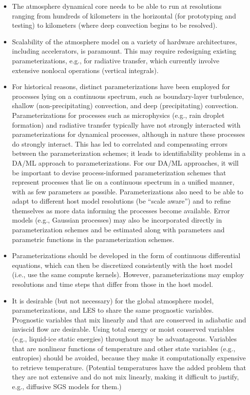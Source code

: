 \documentclass{article}
\begin{document}
\begin{itemize}
    \item The atmosphere dynamical core needs to be able to run at resolutions ranging from hundreds of kilometers in the horizontal (for prototyping and testing) to kilometers (where deep convection begins to be resolved).
    \item Scalability of the atmosphere model on a variety of hardware architectures, including accelerators, is paramount. This may require redesigning existing parameterizations, e.g., for radiative transfer, which currently involve extensive nonlocal operations (vertical integrals). 
    \item For historical reasons, distinct parameterizations have been employed for processes lying on a continuous spectrum, such as boundary-layer turbulence, shallow (non-precipitating) convection, and deep (precipitating) convection. Parameterizations for processes such as microphysics (e.g., rain droplet formation) and radiative transfer typically have not strongly interacted with parameterizations for dynamical processes, although in nature these processes do strongly interact. This has led to correlated and compensating errors between the parameterization schemes; it leads to identifiability problems in a DA/ML approach to parameterizations. For our DA/ML approaches, it will be important to devise process-informed parameterization schemes that represent processes that lie on a continuous spectrum in a unified manner, with as few parameters as possible. Parameterizations also need to be able to adapt to different host model resolutions (be ``scale aware'') and to refine themselves as more data informing the processes become available. Error models (e.g., Gaussian processes) may also be incorporated directly in parameterization schemes and be estimated along with parameters and parametric functions in the parameterization schemes. 
    \item Parameterizations should be developed in the form of continuous differential equations, which can then be discretized consistently with the host model (i.e., use the same compute kernels). However, parameterizations may employ resolutions and time steps that differ from those in the host model. 
    \item It is desirable (but not necessary) for the global atmosphere model, parameterizations, and LES to share the same prognostic variables. Prognostic variables that mix linearly and that are conserved in adiabatic and inviscid flow are desirable. Using total energy or moist conserved variables (e.g., liquid-ice static energies) throughout may be advantageous. Variables that are nonlinear functions of temperature and other state variables (e.g., entropies) should be avoided, because they make it computationally expensive to retrieve temperature. (Potential temperatures have the added problem that they are not extensive and do not mix linearly, making it difficult to justify, e.g., diffusive SGS models for them.) 
\end{itemize}
\end{document}
